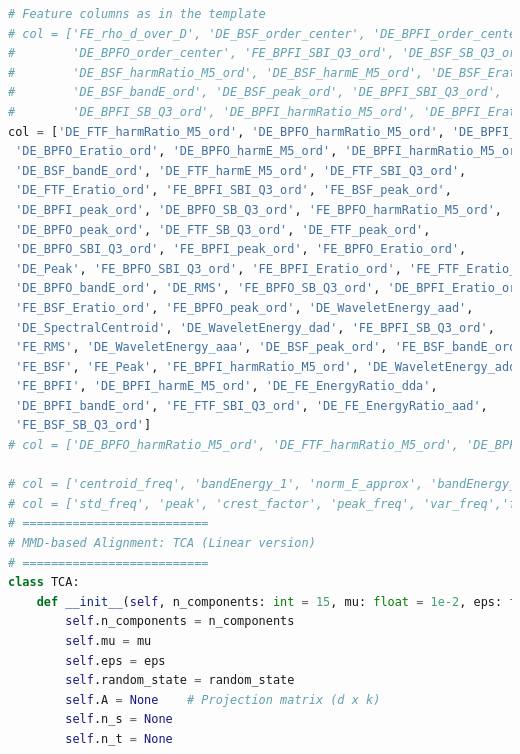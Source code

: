 \documentclass[a4paper]{CPIPC}
\numberwithin{equation}{section}
\begin{document}
\begin{lstlisting}[language=Python, caption=Random Forest Classifier]
# Feature columns as in the template
# col = ['FE_rho_d_over_D', 'DE_BSF_order_center', 'DE_BPFI_order_center',
#        'DE_BPFO_order_center', 'FE_BPFI_SBI_Q3_ord', 'DE_BSF_SB_Q3_ord',
#        'DE_BSF_harmRatio_M5_ord', 'DE_BSF_harmE_M5_ord', 'DE_BSF_Eratio_ord',
#        'DE_BSF_bandE_ord', 'DE_BSF_peak_ord', 'DE_BPFI_SBI_Q3_ord',
#        'DE_BPFI_SB_Q3_ord', 'DE_BPFI_harmRatio_M5_ord', 'DE_BPFI_Eratio_ord']
col = ['DE_FTF_harmRatio_M5_ord', 'DE_BPFO_harmRatio_M5_ord', 'DE_BPFI_SBI_Q3_ord',
 'DE_BPFO_Eratio_ord', 'DE_BPFO_harmE_M5_ord', 'DE_BPFI_harmRatio_M5_ord',
 'DE_BSF_bandE_ord', 'DE_FTF_harmE_M5_ord', 'DE_FTF_SBI_Q3_ord',
 'DE_FTF_Eratio_ord', 'FE_BPFI_SBI_Q3_ord', 'FE_BSF_peak_ord',
 'DE_BPFI_peak_ord', 'DE_BPFO_SB_Q3_ord', 'FE_BPFO_harmRatio_M5_ord',
 'DE_BPFO_peak_ord', 'DE_FTF_SB_Q3_ord', 'DE_FTF_peak_ord',
 'DE_BPFO_SBI_Q3_ord', 'FE_BPFI_peak_ord', 'FE_BPFO_Eratio_ord',
 'DE_Peak', 'FE_BPFO_SBI_Q3_ord', 'FE_BPFI_Eratio_ord', 'FE_FTF_Eratio_ord',
 'DE_BPFO_bandE_ord', 'DE_RMS', 'FE_BPFO_SB_Q3_ord', 'DE_BPFI_Eratio_ord',
 'FE_BSF_Eratio_ord', 'FE_BPFO_peak_ord', 'DE_WaveletEnergy_aad',
 'DE_SpectralCentroid', 'DE_WaveletEnergy_dad', 'FE_BPFI_SB_Q3_ord',
 'FE_RMS', 'DE_WaveletEnergy_aaa', 'DE_BSF_peak_ord', 'FE_BSF_bandE_ord',
 'FE_BSF', 'FE_Peak', 'FE_BPFI_harmRatio_M5_ord', 'DE_WaveletEnergy_add',
 'FE_BPFI', 'DE_BPFI_harmE_M5_ord', 'DE_FE_EnergyRatio_dda',
 'DE_BPFI_bandE_ord', 'FE_FTF_SBI_Q3_ord', 'DE_FE_EnergyRatio_aad',
 'FE_BSF_SB_Q3_ord']
# col = ['DE_BPFO_harmRatio_M5_ord', 'DE_FTF_harmRatio_M5_ord', 'DE_BPFI_SBI_Q3_ord','DE_BPFO_harmE_M5_ord', 'DE_BPFO_Eratio_ord', 'DE_BPFI_harmRatio_M5_ord','DE_BSF_bandE_ord', 'DE_FTF_SBI_Q3_ord', 'FE_BPFI_SBI_Q3_ord','DE_FTF_harmE_M5_ord', 'FE_BSF_peak_ord', 'DE_FTF_Eratio_ord','DE_BPFO_SBI_Q3_ord', 'DE_BPFI_peak_ord', 'FE_BPFO_harmRatio_M5_ord','FE_BSF_Eratio_ord', 'FE_BPFO_Eratio_ord', 'DE_BPFO_peak_ord','DE_WaveletEnergy_aad', 'FE_FTF_Eratio_ord', 'DE_FTF_peak_ord','FE_BPFI_harmRatio_M5_ord', 'DE_RMS', 'DE_BPFO_SB_Q3_ord','FE_BPFO_SBI_Q3_ord', 'DE_Peak', 'FE_BPFI_peak_ord', 'DE_BPFI_harmE_M5_ord','DE_BPFI_Eratio_ord', 'DE_FE_EnergyRatio_aaa']

# col = ['centroid_freq', 'bandEnergy_1', 'norm_E_approx', 'bandEnergy_4', 'bandEnergy_6','bsf_energy', 'bpfi_energy', 'bandEnergy_5', 'norm_E_d1', 'mean_freq'];
# col = ['std_freq', 'peak', 'crest_factor', 'peak_freq', 'var_freq','ftf_over_fr', 'mean_freq', 'skewness', 'impulse_factor', 'clearance_factor']
# ==========================
# MMD-based Alignment: TCA (Linear version)
# ==========================
class TCA:
    def __init__(self, n_components: int = 15, mu: float = 1e-2, eps: float = 1e-6, random_state: int = 42):
        self.n_components = n_components
        self.mu = mu
        self.eps = eps
        self.random_state = random_state
        self.A = None    # Projection matrix (d x k)
        self.n_s = None
        self.n_t = None


\end{lstlisting}
\end{document}
